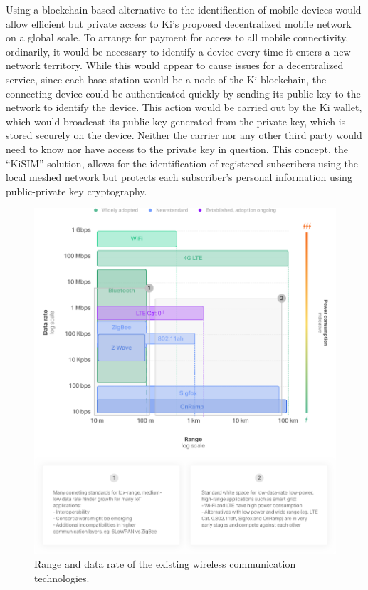 Using a blockchain-based alternative to the identification of mobile devices would allow efficient but private access to Ki's proposed decentralized mobile network on a global scale. To arrange for payment for access to all mobile connectivity, ordinarily, it would be necessary to identify a device every time it enters a new network territory. While this would appear to cause issues for a decentralized service, since each base station would be a node of the Ki blockchain, the connecting device could be authenticated quickly by sending its public key to the network to identify the device. This action would be carried out by the Ki wallet, which would broadcast its public key generated from the private key, which is stored securely on the device. Neither the carrier nor any other third party would need to know nor have access to the private key in question. This concept, the ``KiSIM'' solution, allows for the identification of registered subscribers using the local meshed network but protects each subscriber's personal information using public-private key cryptography.
\begin{figure}[!ht]
\centering
	\includegraphics[width=0.9\linewidth, trim= 0cm 0cm 0cm 0cm, clip]{Figures/wireless.png}
	\caption{Range and data rate of the existing wireless communication technologies.}
	\label{fig:wireless}
\end{figure}
